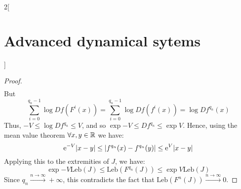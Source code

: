 \documentclass[../../../main_math.tex]{subfiles}
\begin{document}
\begin{multicols}{2}[\section{Advanced dynamical sytems}]
\begin{proof}
\begin{multline*}
    \end{multline*}
    But $$
      \sum_{i=0}^{q_n-1}\log Df(F^i(x))=\sum_{i=0}^{q_n-1}\log Df(f^i(x))=\log Df^{q_n}(x)
    $$
    Thus, $-V\leq \log Df^{q_n}\leq V$, and so $\exp{-V}\leq Df^{q_n}\leq \exp{V}$. Hence, using the mean value theorem $\forall x,y\in\mathbb{R}$ we have:
    $$
      \mathrm{e}^{-V}\abs{x-y}\leq \abs{f^{q_n}(x)-f^{q_n}(y)}\leq\mathrm{e}^{V}\abs{x-y}
    $$
    Applying this to the extremities of $J$, we have:
    $$
      \exp{-V}\text{Leb}(J)\leq \text{Leb}(F^{q_n}(J))\leq \exp{V}\text{Leb}(J)
    $$
    Since $q_n\overset{n\to\infty}{\longrightarrow}+\infty$, this contradicts the fact that $\text{Leb}(F^n(J))\overset{n\to\infty}{\longrightarrow}0$.
  \end{proof}
\end{multicols}
\end{document}
